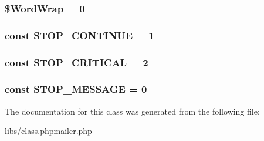 \subsubsection[{\$\+Word\+Wrap}]{\setlength{\rightskip}{0pt plus 5cm}\$Word\+Wrap = 0}\label{class_p_h_p_mailer_a8e8553ff133401f5324229a988995a34}
\hypertarget{class_p_h_p_mailer_afd1dcd18845b2e660d89726b20cd566e}{}
\subsubsection[{S\+T\+O\+P\+\_\+\+C\+O\+N\+T\+I\+N\+U\+E}]{\setlength{\rightskip}{0pt plus 5cm}const S\+T\+O\+P\+\_\+\+C\+O\+N\+T\+I\+N\+U\+E = 1}\label{class_p_h_p_mailer_afd1dcd18845b2e660d89726b20cd566e}
\hypertarget{class_p_h_p_mailer_a9f37e989efccad58c693cdb0481c881f}{}
\subsubsection[{S\+T\+O\+P\+\_\+\+C\+R\+I\+T\+I\+C\+A\+L}]{\setlength{\rightskip}{0pt plus 5cm}const S\+T\+O\+P\+\_\+\+C\+R\+I\+T\+I\+C\+A\+L = 2}\label{class_p_h_p_mailer_a9f37e989efccad58c693cdb0481c881f}
\hypertarget{class_p_h_p_mailer_a18ac47549c5fb56a395b374b3c23f04f}{}
\subsubsection[{S\+T\+O\+P\+\_\+\+M\+E\+S\+S\+A\+G\+E}]{\setlength{\rightskip}{0pt plus 5cm}const S\+T\+O\+P\+\_\+\+M\+E\+S\+S\+A\+G\+E = 0}\label{class_p_h_p_mailer_a18ac47549c5fb56a395b374b3c23f04f}


The documentation for this class was generated from the following file\+:\begin{DoxyCompactItemize}
\item 
libs/\hyperlink{class_8phpmailer_8php}{class.\+phpmailer.\+php}\end{DoxyCompactItemize}
